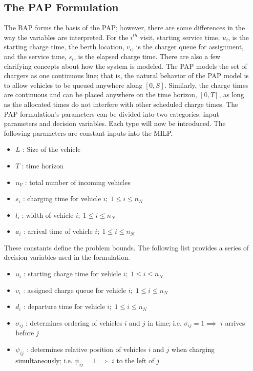 \documentclass[utf8]{FrontiersinHarvard}
\begin{document}
\subsection{The PAP Formulation}
\label{sec:the-pap-formulation}
The BAP forms the basis of the PAP; however, there are some differences in the way the variables are interpreted. For
the \(i^{th}\) visit, starting service time, \(u_i\), is the starting charge time, the berth location, \(v_i\), is the charger
queue for assignment, and the service time, \(s_i\), is the elapsed charge time. There are also a few clarifying concepts
about how the system is modeled. The PAP models the set of chargers as one continuous line; that is, the natural
behavior of the PAP model is to allow vehicles to be queued anywhere along \([0,S]\). Similarly, the charge times are
continuous and can be placed anywhere on the time horizon, \([0,T]\), as long as the allocated times do not interfere with
other scheduled charge times. The PAP formulation's parameters can be divided into two categories: input parameters and
decision variables. Each type will now be introduced. The following parameters are constant inputs into the MILP.

\begin{itemize}
	\item $L$   : Size of the vehicle
	\item $T$   : time horizon
	\item $n_V$ : total number of incoming vehicles
	\item $s_i$ : charging time for vehicle $i;\; 1 \leq i \leq n_N$
	\item $l_i$ : width of vehicle $i;\; 1 \leq i \leq n_N$
	\item $a_i$ : arrival time of vehicle $i;\; 1 \leq i \leq n_N$
\end{itemize}

These constants define the problem bounds. The following list provides a series of decision variables used in the
formulation.

\begin{itemize}
    \item $u_i$    : starting charge time for vehicle $i;\; 1 \leq i \leq n_N$
    \item $v_i$    : assigned charge queue for vehicle $i;\; 1 \leq i \leq n_N$
    \item $d_i$    : departure time for vehicle $i;\; 1 \leq i \leq n_N$
    \item $\sigma_{ij}$ : determines ordering of vehicles $i$ and $j$ in time; i.e. $\sigma_{ij} = 1 \implies$ $i$ arrives before $j$
    \item $\psi_{ij}$ : determines relative position of vehicles $i$ and $j$ when charging simultaneously; i.e. $\psi_{ij} = 1 \implies$ $i$ to the left of $j$
\end{itemize}
\end{document}
